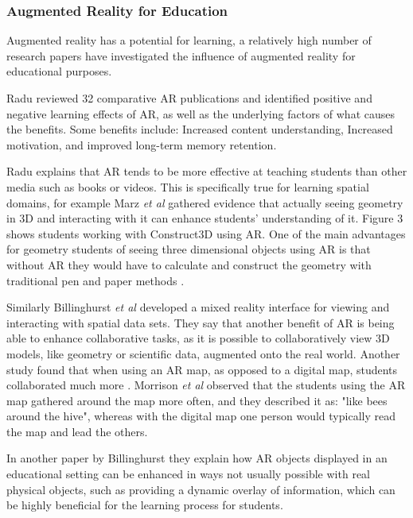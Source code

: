 \documentclass[journal]{IEEEtran}
\begin{document}
\subsubsection{Augmented Reality for Education} \label{Augmented Reality Education}
Augmented reality has a potential for learning, a relatively high number of research papers have investigated the influence of augmented reality for educational purposes. 

Radu \cite{radu_why_2012} reviewed 32 comparative AR publications and identified positive and negative learning effects of AR, as well as the underlying factors of what causes the benefits. Some benefits include: Increased content understanding, Increased motivation, and improved long-term memory retention. 

Radu \cite{radu_why_2012} explains that AR tends to be more effective at teaching students than other media such as books or videos. This is specifically true for learning spatial domains, for example Marz \textit{et al} \cite{marz_dissertation_nodate} gathered evidence that actually seeing geometry in 3D and interacting with it can enhance students' understanding of it. Figure 3 shows students working with Construct3D using AR. One of the main advantages for geometry students of seeing three dimensional objects using AR is that without AR they would have to calculate and construct the geometry with traditional pen and paper methods \cite{kaufmann_mathematics_nodate}. 

Similarly Billinghurst \textit{et al} \cite{billinghurst_magicbook:_2001} developed a mixed reality interface for viewing and interacting with spatial data sets. They say that another benefit of AR is being able to enhance collaborative tasks, as it is possible to collaboratively view 3D models, like geometry or scientific data, augmented onto the real world. Another study found that when using an AR map, as opposed to a digital map, students collaborated much more \cite{morrison_like_2009}. Morrison \textit{et al} observed that the students using the AR map gathered around the map more often, and they described it as: "like bees around the hive", whereas with the digital map one person would typically read the map and lead the others.

In another paper by Billinghurst \cite{billinghurst_augmented_nodate} they explain how AR objects displayed in an educational setting can be enhanced in ways not usually possible with real physical objects, such as providing a dynamic overlay of information, which can be highly beneficial for the learning process for students.
\end{document}

